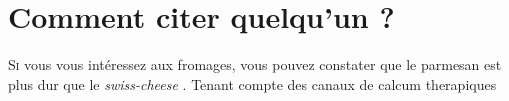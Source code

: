 \documentclass[a4paper]{article}
\begin{document}
\section{Comment citer quelqu'un ? }

\lettrine{S}{i} vous vous intéressez aux fromages, vous pouvez constater que le parmesan est plus dur que le \emph{swiss-cheese} \cite{CHEN1979901}. Tenant compte des canaux de calcum therapiques \cite{https://doi.org/10.1113/jphysiol.1987.sp016518}

\vfill

\printbibliography
\end{document}
